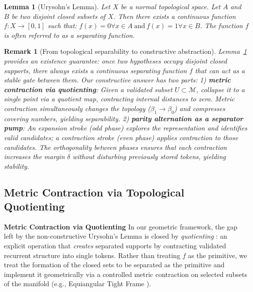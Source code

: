 \documentclass{article}
\newtheorem{lemma}{Lemma}
\newtheorem{remark}{Remark}
\begin{document}
\begin{lemma}[Urysohn's Lemma]
\label{lem:urysohn}
Let $X$ be a normal topological space. Let $A$ and $B$ be two disjoint closed subsets of $X$.
Then there exists a continuous function $f: X \to [0, 1]$ such that:
$f(x) = 0 \forall x \in A ~\text{and}~ f(x) = 1 \forall x \in B$.
The function $f$ is often referred to as a \textit{separating function}.
\end{lemma}
 
\begin{remark}[From topological separability to constructive abstraction]
Lemma~\ref{lem:urysohn} provides an existence guarantee: once two hypotheses occupy disjoint closed
supports, there always exists a continuous \emph{separating function} $f$ that can act as a stable gate
between them. %
Our constructive answer has two parts:
1) \textbf{metric contraction via quotienting}: Given a validated subset $U \subset \mathcal{M}$, collapse it to a single point via a quotient map, contracting internal distances to zero. Metric contraction simultaneously changes the topology ($\beta_1 \to \beta_0$) and compresses covering numbers, yielding separability.
2) \textbf{parity alternation as a separator pump}: An expansion stroke (odd phase) explores the representation and identifies valid candidates; a contraction stroke (even phase) applies contraction to those candidates. The orthogonality between phases ensures that each contraction increases the margin $\delta$ without disturbing previously stored tokens, yielding stability.
\end{remark}

\subsection{Metric Contraction via Topological Quotienting}
 
\noindent\textbf{Metric Contraction via Quotienting}
In our geometric framework, the gap left by the non-constructive Urysohn's Lemma is closed by \emph{quotienting} \cite{burago2001course}: an explicit operation that \emph{creates} separated supports by contracting validated recurrent structure into single tokens. Rather than
treating $f$ as the primitive, we treat the formation of the closed sets to be separated as the
primitive and implement it geometrically via a controlled metric contraction on selected
subsets of the manifold (e.g., Equiangular Tight Frame \cite{papyan2020prevalence}).
 
\end{document}
